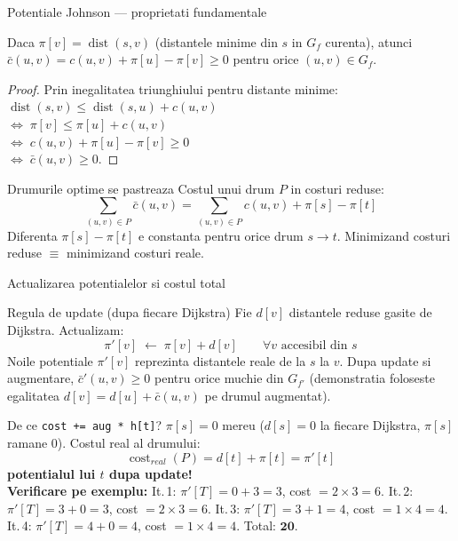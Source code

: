 ﻿\documentclass[9pt]{beamer}
\newcommand{\cost}{\operatorname{cost}}
\newcommand{\dist}{\operatorname{dist}}
\newcommand{\cbar}{\bar{c}}
\begin{document}
\begin{frame}[shrink]{Potentiale Johnson --- proprietati fundamentale}
  \begin{theorem}
    Daca $\pi[v]=\dist(s,v)$ (distantele minime din $s$ in $G_f$ curenta),
    atunci $\cbar(u,v)=c(u,v)+\pi[u]-\pi[v]\geq 0$ pentru orice $(u,v)\in G_f$.
  \end{theorem}
  \begin{proof}
    Prin inegalitatea triunghiului pentru distante minime:\\[2pt]
    $\dist(s,v)\leq\dist(s,u)+c(u,v)$\\[1pt]
    $\Leftrightarrow\;\pi[v]\leq\pi[u]+c(u,v)$\\[1pt]
    $\Leftrightarrow\;c(u,v)+\pi[u]-\pi[v]\geq 0$\\[1pt]
    $\Leftrightarrow\;\cbar(u,v)\geq 0$.
  \end{proof}
  \begin{block}{Drumurile optime se pastreaza}
    Costul unui drum $P$ in costuri reduse:
    \[
      \sum_{(u,v)\in P}\cbar(u,v) = \sum_{(u,v)\in P}c(u,v) + \pi[s] - \pi[t]
    \]
    Diferenta $\pi[s]-\pi[t]$ e constanta pentru orice drum $s\to t$.
    Minimizand costuri reduse $\equiv$ minimizand costuri reale.
  \end{block}
\end{frame}

\begin{frame}[shrink]{Actualizarea potentialelor si costul total}
  \begin{block}{Regula de update (dupa fiecare Dijkstra)}
    Fie $d[v]$ distantele reduse gasite de Dijkstra. Actualizam:
    \[
      \pi'[v] \;\leftarrow\; \pi[v] + d[v] \qquad\forall v \text{ accesibil din } s
    \]
    Noile potentiale $\pi'[v]$ reprezinta distantele reale de la $s$ la $v$.
    Dupa update si augmentare, $\cbar'(u,v)\geq 0$ pentru orice muchie din $G_{f'}$
    (demonstratia foloseste egalitatea $d[v]=d[u]+\cbar(u,v)$ pe drumul augmentat).
  \end{block}
  \begin{block}{De ce \lstinline|cost += aug * h[t]|?}
    \footnotesize
    $\pi[s]=0$ mereu ($d[s]=0$ la fiecare Dijkstra, $\pi[s]$ ramane 0).
    Costul real al drumului:
    \[
      \cost_{real}(P) = d[t] + \pi[t] = \pi'[t]
    \]
    \textemdash{} \textbf{potentialul lui $t$ dupa update!}\\[4pt]
    \textbf{Verificare pe exemplu:}
    It.\,1: $\pi'[T]=0+3=3$, cost $=2\times 3=6$.
    It.\,2: $\pi'[T]=3+0=3$, cost $=2\times 3=6$.
    It.\,3: $\pi'[T]=3+1=4$, cost $=1\times 4=4$.
    It.\,4: $\pi'[T]=4+0=4$, cost $=1\times 4=4$.
    Total: $\mathbf{20}$. \checkmark
  \end{block}
\end{frame}
\end{document}
